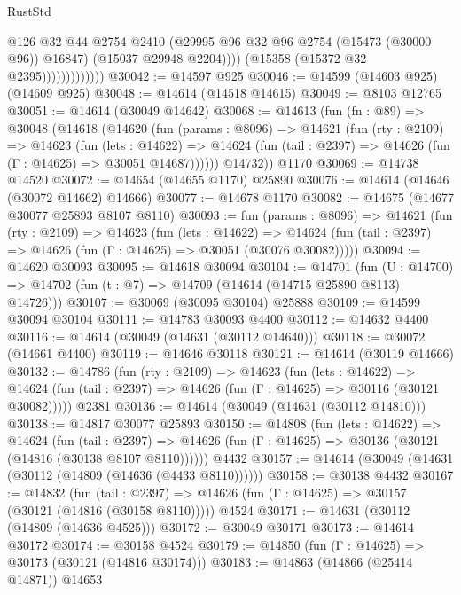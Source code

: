 \begin{lexlean}{RustStd}
\begin{coremodule}
                                @126
                                @32
                                @44
                                @2754
                                @2410
                                (@29995 @96 @32 @96 @2754 (@15473 (@30000 @96)) @16847)
                                (@15037 @29948 @2204))))
                          (@15358 (@15372 @32 @2395)))))))))))))
@30042 := @14597 @925
@30046 := @14599 (@14603 @925) (@14609 @925)
@30048 := @14614 (@14518 @14615)
@30049 := @8103 @12765
@30051 := @14614 (@30049 @14642)
@30068 := @14613
    (fun (fn : @89) =>
    @30048
      (@14618
        (@14620
          (fun (params : @8096) =>
          @14621
            (fun (rty : @2109) =>
            @14623
              (fun (lets : @14622) =>
              @14624 (fun (tail : @2397) => @14626 (fun (Γ : @14625) => @30051 @14687))))))
        @14732))
    @1170
@30069 := @14738 @14520
@30072 := @14654 (@14655 @1170) @25890
@30076 := @14614 (@14646 (@30072 @14662) @14666)
@30077 := @14678 @1170
@30082 := @14675 (@14677 @30077 @25893 @8107 @8110)
@30093 := fun (params : @8096) =>
  @14621
    (fun (rty : @2109) =>
    @14623
      (fun (lets : @14622) =>
      @14624 (fun (tail : @2397) => @14626 (fun (Γ : @14625) => @30051 (@30076 @30082)))))
@30094 := @14620 @30093
@30095 := @14618 @30094
@30104 := @14701
    (fun (U : @14700) => @14702 (fun (t : @7) => @14709 (@14614 (@14715 @25890 @8113) @14726)))
@30107 := @30069 (@30095 @30104) @25888
@30109 := @14599 @30094 @30104
@30111 := @14783 @30093 @4400
@30112 := @14632 @4400
@30116 := @14614 (@30049 (@14631 (@30112 @14640)))
@30118 := @30072 (@14661 @4400)
@30119 := @14646 @30118
@30121 := @14614 (@30119 @14666)
@30132 := @14786
    (fun (rty : @2109) =>
    @14623
      (fun (lets : @14622) =>
      @14624 (fun (tail : @2397) => @14626 (fun (Γ : @14625) => @30116 (@30121 @30082)))))
    @2381
@30136 := @14614 (@30049 (@14631 (@30112 @14810)))
@30138 := @14817 @30077 @25893
@30150 := @14808
    (fun (lets : @14622) =>
    @14624
      (fun (tail : @2397) =>
      @14626 (fun (Γ : @14625) => @30136 (@30121 (@14816 (@30138 @8107 @8110))))))
    @4432
@30157 := @14614 (@30049 (@14631 (@30112 (@14809 (@14636 (@4433 @8110))))))
@30158 := @30138 @4432
@30167 := @14832
    (fun (tail : @2397) => @14626 (fun (Γ : @14625) => @30157 (@30121 (@14816 (@30158 @8110)))))
    @4524
@30171 := @14631 (@30112 (@14809 (@14636 @4525)))
@30172 := @30049 @30171
@30173 := @14614 @30172
@30174 := @30158 @4524
@30179 := @14850 (fun (Γ : @14625) => @30173 (@30121 (@14816 @30174)))
@30183 := @14863 (@14866 (@25414 @14871)) @14653

\end{coremodule}
\end{lexlean}
